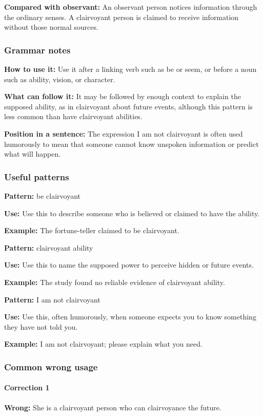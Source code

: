 \documentclass[11pt]{article}
\begin{document}
\textbf{Compared with observant:} An observant person notices information through the ordinary senses. A clairvoyant person is claimed to receive information without those normal sources.

\subsubsection{Grammar notes}
\textbf{How to use it:} Use it after a linking verb such as be or seem, or before a noun such as ability, vision, or character.

\textbf{What can follow it:} It may be followed by enough context to explain the supposed ability, as in clairvoyant about future events, although this pattern is less common than have clairvoyant abilities.

\textbf{Position in a sentence:} The expression I am not clairvoyant is often used humorously to mean that someone cannot know unspoken information or predict what will happen.

\subsubsection{Useful patterns}
\textbf{Pattern:} be clairvoyant

\textbf{Use:} Use this to describe someone who is believed or claimed to have the ability.

\textbf{Example:} The fortune-teller claimed to be clairvoyant.

\textbf{Pattern:} clairvoyant ability

\textbf{Use:} Use this to name the supposed power to perceive hidden or future events.

\textbf{Example:} The study found no reliable evidence of clairvoyant ability.

\textbf{Pattern:} I am not clairvoyant

\textbf{Use:} Use this, often humorously, when someone expects you to know something they have not told you.

\textbf{Example:} I am not clairvoyant; please explain what you need.

\subsubsection{Common wrong usage}
\paragraph{Correction 1}
\textbf{Wrong:} She is a clairvoyant person who can clairvoyance the future.
\end{document}
